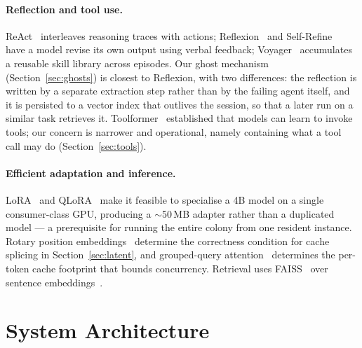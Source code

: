 \documentclass[11pt]{article}
\begin{document}
\paragraph{Reflection and tool use.}
ReAct~\cite{yao2023react} interleaves reasoning traces with actions;
Reflexion~\cite{shinn2023reflexion} and Self-Refine~\cite{madaan2023selfrefine}
have a model revise its own output using verbal feedback;
Voyager~\cite{wang2023voyager} accumulates a reusable skill library across
episodes. Our ghost mechanism (Section~\ref{sec:ghosts}) is closest to
Reflexion, with two differences: the reflection is written by a separate
extraction step rather than by the failing agent itself, and it is persisted to
a vector index that outlives the session, so that a later run on a similar task
retrieves it. Toolformer~\cite{schick2023toolformer} established that models
can learn to invoke tools; our concern is narrower and operational, namely
containing what a tool call may do (Section~\ref{sec:tools}).

\paragraph{Efficient adaptation and inference.}
LoRA~\cite{hu2021lora} and QLoRA~\cite{dettmers2023qlora} make it feasible to
specialise a 4B model on a single consumer-class GPU, producing a
$\sim$50\,MB adapter rather than a duplicated model --- a prerequisite for
running the entire colony from one resident instance. Rotary position
embeddings~\cite{su2021rope} determine the correctness condition for cache
splicing in Section~\ref{sec:latent}, and grouped-query
attention~\cite{ainslie2023gqa} determines the per-token cache footprint that
bounds concurrency. Retrieval uses FAISS~\cite{johnson2017faiss} over
sentence embeddings~\cite{reimers2019sbert}.

\section{System Architecture}
\end{document}
